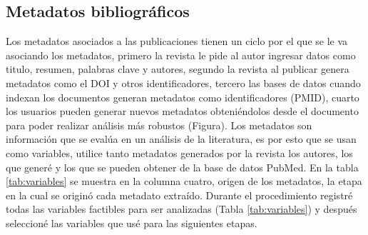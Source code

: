 \subsection{Metadatos bibliográficos}
Los metadatos asociados a las publicaciones tienen un ciclo por el que se le va asociando los metadatos, 
primero la revista le pide al autor ingresar datos como titulo, 
resumen, palabras clave y autores, segundo la revista al publicar genera metadatos como el DOI 
y otros identificadores, tercero las bases de datos cuando indexan los documentos generan 
metadatos como identificadores (PMID), cuarto los usuarios pueden generar nuevos metadatos obteniéndolos 
desde el documento para poder realizar análisis más robustos (Figura).%
Los metadatos son información que se evalúa en un análisis de la literatura, 
es por esto que se usan como variables, utilice tanto metadatos generados por la revista los autores, 
los que generé y los que se pueden obtener de la base de datos PubMed.  
En la tabla \ref{tab:variables} se muestra en la columna cuatro, 
origen de los metadatos, la etapa en la cual se originó cada metadato 
extraído. 
Durante el procedimiento registré todas las variables factibles 
para ser analizadas (Tabla \ref{tab:variables}) y  después seleccioné las variables 
que usé para las siguientes etapas.  
